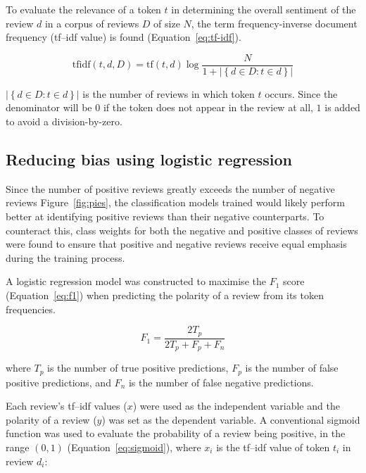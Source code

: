 \documentclass[12pt, a4paper, oneside]{pancake-article}
\begin{document}
To evaluate the relevance of a token \(t\) in determining the overall
sentiment of the
review \(d\) in a corpus of reviews \(D\) of size \(N\), the term
frequency-inverse document frequency
(tf--idf value) is found (Equation~\ref{eq:tf-idf}).

\begin{equation}
  \text{tfidf}\left(t, d, D\right) = \text{tf}\left(t,
  d\right)\log\frac{N}{1 + \left|\left\{d \in D : t\in d\right\}\right|}
  \label{eq:tf-idf}
\end{equation}

\(\left|\left\{d \in D : t \in d\right\}\right|\) is the number of
reviews in which token \(t\) occurs.
Since the denominator will be \(0\) if the token does not appear in
the review at all, \(1\) is added
to avoid a division-by-zero.

\subsection{Reducing bias using logistic regression}

Since the number of positive reviews greatly exceeds the number of
negative reviews Figure~\ref{fig:pies},
the classification models trained would likely perform better at
identifying positive reviews than their
negative counterparts. To counteract this, class weights for both the
negative and positive classes of reviews
were found to ensure that positive and negative reviews receive equal
emphasis during the training process.

A logistic regression model was constructed to maximise the $F_1$
score (Equation~\ref{eq:f1}) when
predicting the polarity of a review from its token frequencies.

\begin{equation}
  F_1 = \frac{2 T_p}{2 T_p + F_p + F_n}
  \label{eq:f1}
\end{equation}

where $T_p$ is the number of true positive predictions, $F_p$ is the
number of false positive predictions,
and $F_n$ is the number of false negative predictions.

Each review's tf--idf values ($x$) were used as the independent
variable and the polarity of a review ($y$) was set
as the dependent variable. A conventional sigmoid function was used
to evaluate the probability of a review being positive, in the range
\(\left(0, 1\right)\) (Equation~\ref{eq:sigmoid}), where \(x_i\) is
the tf--idf value of token \(t_i\) in
review \(d_i\):
\end{document}
